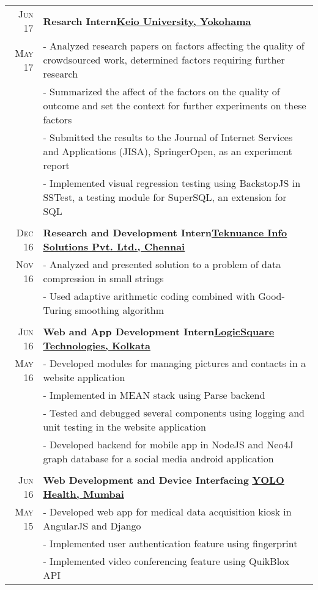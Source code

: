 \documentclass[a4paper,11pt]{extarticle} %
\begin{document}
\begin{tabular}{r|p{18cm}}

\textsc{Jun 17} & \textbf{Resarch Intern}\hfill\textbf{\href{https://www.keio.ac.jp/en/}{Keio University, Yokohama}}\\
\textsc{May 17}& \footnotesize{- Analyzed research papers on factors affecting the quality of crowdsourced work, determined factors requiring further research}\\
& \footnotesize{- Summarized the affect of the factors on the quality of outcome and set the context for further experiments on these factors}\\
& \footnotesize{- Submitted the results to the Journal of Internet Services and Applications (JISA), SpringerOpen, as an experiment report}\\
& \footnotesize{- Implemented visual regression testing using BackstopJS in SSTest, a testing module for SuperSQL, an extension for SQL}\\
\multicolumn{2}{c}{} \\

\textsc{Dec 16} & \textbf{Research and Development Intern}\hfill\textbf{\href{http://www.teknuance.com/}{Teknuance Info Solutions Pvt. Ltd., Chennai}}\\
\textsc{Nov 16} & \footnotesize{- Analyzed and presented solution to a problem of data compression in small strings}\\
& \footnotesize{- Used adaptive arithmetic coding combined with Good-Turing smoothing algorithm}\\
\multicolumn{2}{c}{}\\

\textsc{Jun 16} & \textbf{Web and App Development Intern}\hfill\textbf{\href{http://www.logic-square.com/}{LogicSquare Technologies, Kolkata}}\\
\textsc{May 16}& \footnotesize{- Developed modules for managing pictures and contacts in a website application}\\
& \footnotesize{- Implemented in MEAN stack using Parse backend}\\
& \footnotesize{- Tested and debugged several components using logging and unit testing in the website application}\\
& \footnotesize{- Developed backend for mobile app in NodeJS and Neo4J graph database for a social media android application}\\
\multicolumn{2}{c}{} \\

\textsc{Jun 16} & \textbf{Web Development and Device Interfacing} \hfill\textbf{\href{https://yolohealth.in/}{YOLO Health, Mumbai}}\\
\textsc{May 15} & \footnotesize{- Developed web app for medical data acquisition kiosk in AngularJS and Django}\\
& \footnotesize{- Implemented user authentication feature using fingerprint}\\
& \footnotesize{- Implemented video conferencing feature using QuikBlox API}\\
\end{tabular}
\end{document}
